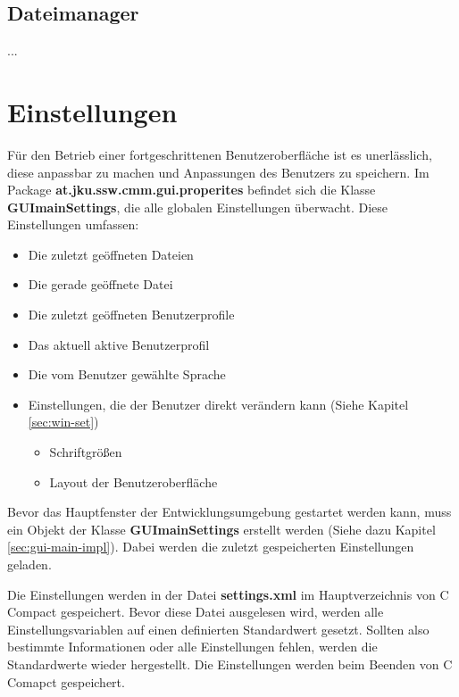 \subsection{Dateimanager}
...

\section{Einstellungen}
\label{sec:guimainsettings}
Für den Betrieb einer fortgeschrittenen Benutzeroberfläche ist es unerlässlich, diese anpassbar zu machen und Anpassungen des Benutzers zu speichern. Im Package \textbf{at.jku.ssw.cmm.gui.properites} befindet sich die Klasse \textbf{GUImainSettings}, die alle globalen Einstellungen überwacht. Diese Einstellungen umfassen:
\begin{itemize}
\item Die zuletzt geöffneten Dateien
\item Die gerade geöffnete Datei
\item Die zuletzt geöffneten Benutzerprofile
\item Das aktuell aktive Benutzerprofil
\item Die vom Benutzer gewählte Sprache
\item Einstellungen, die der Benutzer direkt verändern kann (Siehe Kapitel \ref{sec:win-set})
\begin{itemize}
\item Schriftgrößen
\item Layout der Benutzeroberfläche
\end{itemize}
\end{itemize}

Bevor das Hauptfenster der Entwicklungsumgebung gestartet werden kann, muss ein Objekt der Klasse \textbf{GUImainSettings} erstellt werden (Siehe dazu Kapitel \ref{sec:gui-main-impl}). Dabei werden die zuletzt gespeicherten Einstellungen geladen.

Die Einstellungen werden in der Datei \textbf{settings.xml} im Hauptverzeichnis von C Compact gespeichert. Bevor diese Datei ausgelesen wird, werden alle Einstellungsvariablen auf einen definierten Standardwert gesetzt. Sollten also bestimmte Informationen oder alle Einstellungen fehlen, werden die Standardwerte wieder hergestellt. Die Einstellungen werden beim Beenden von C Comapct gespeichert.

